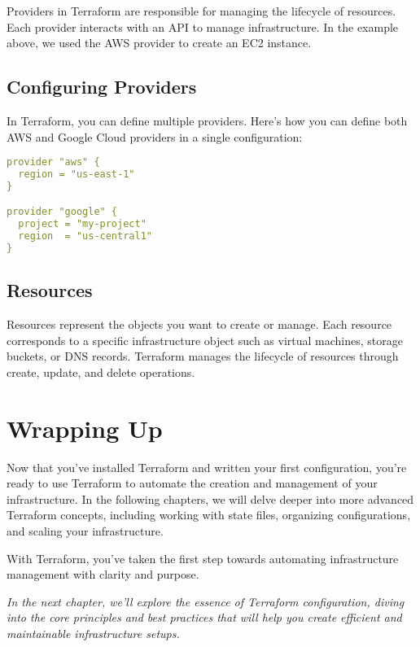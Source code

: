 Providers in Terraform are responsible for managing the lifecycle of resources. Each provider interacts with an API to manage infrastructure. In the example above, we used the AWS provider to create an EC2 instance.

\subsection{Configuring Providers}

In Terraform, you can define multiple providers. Here's how you can define both AWS and Google Cloud providers in a single configuration:

\begin{lstlisting}[language=yaml]
provider "aws" {
  region = "us-east-1"
}

provider "google" {
  project = "my-project"
  region  = "us-central1"
}
\end{lstlisting}

\subsection{Resources}

Resources represent the objects you want to create or manage. Each resource corresponds to a specific infrastructure object such as virtual machines, storage buckets, or DNS records. Terraform manages the lifecycle of resources through create, update, and delete operations.
\section{Wrapping Up}

Now that you've installed Terraform and written your first configuration, you're ready to use Terraform to automate the creation and management of your infrastructure. In the following chapters, we will delve deeper into more advanced Terraform concepts, including working with state files, organizing configurations, and scaling your infrastructure.

With Terraform, you've taken the first step towards automating infrastructure management with clarity and purpose.

\vspace{1em}

\textit{In the next chapter, we'll explore the essence of Terraform configuration, diving into the core principles and best practices that will help you create efficient and maintainable infrastructure setups.}
